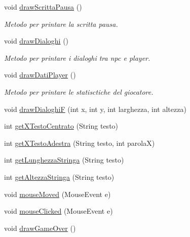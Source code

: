 \begin{DoxyCompactItemize}
void \hyperlink{classa_1_1survival_1_1game_1_1_interfaccia_a5ea2e0aa29eed2ee8e977ec1495103d3}{draw\+Scritta\+Pausa} ()
\begin{DoxyCompactList}\small\item\em Metodo per printare la scritta pausa. \end{DoxyCompactList}\item 
void \hyperlink{classa_1_1survival_1_1game_1_1_interfaccia_a07761ecd195353aa0f33107b57c3c852}{draw\+Dialoghi} ()
\begin{DoxyCompactList}\small\item\em Metodo per printare i dialoghi tra npc e player. \end{DoxyCompactList}\item 
void \hyperlink{classa_1_1survival_1_1game_1_1_interfaccia_aa9a8046a21bf4083e12263a078701107}{draw\+Dati\+Player} ()
\begin{DoxyCompactList}\small\item\em Metodo per printare le statisctiche del giocatore. \end{DoxyCompactList}\item 
void \hyperlink{classa_1_1survival_1_1game_1_1_interfaccia_a73a0c3b24b1d27132d84f43de7262e36}{draw\+DialoghiF} (int x, int y, int larghezza, int altezza)
\item 
int \hyperlink{classa_1_1survival_1_1game_1_1_interfaccia_a33bfff0e4091d0c94334a82514ffa7ec}{get\+X\+Testo\+Centrato} (String testo)
\item 
int \hyperlink{classa_1_1survival_1_1game_1_1_interfaccia_a587ecc556d77a50194f3e80ca09551ce}{get\+X\+Testo\+Adestra} (String testo, int parolaX)
\item 
int \hyperlink{classa_1_1survival_1_1game_1_1_interfaccia_a5e33eb51424c4888d0cd26cf5e0311de}{get\+Lunghezza\+Stringa} (String testo)
\item 
int \hyperlink{classa_1_1survival_1_1game_1_1_interfaccia_af3e544b837451de1ad271a8d32b61385}{get\+Altezza\+Stringa} (String testo)
\item 
void \hyperlink{classa_1_1survival_1_1game_1_1_interfaccia_a2ca251710b65639ec80bc141edde60aa}{mouse\+Moved} (Mouse\+Event e)
\item 
void \hyperlink{classa_1_1survival_1_1game_1_1_interfaccia_a45d56bd84238e8b56589dfc732e2b2cf}{mouse\+Clicked} (Mouse\+Event e)
\item 
void \hyperlink{classa_1_1survival_1_1game_1_1_interfaccia_aeb2c7e9c7d14c9eccb7e624bd9611ef8}{draw\+Game\+Over} ()
\end{DoxyCompactItemize}
